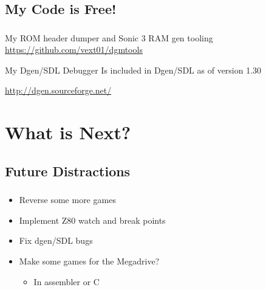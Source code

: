 \documentclass{beamer}
\begin{document}
\subsection{My Code is Free!}
\begin{frame}[fragile]
\frametitle{\insertsubsection}

\begin{block}{My ROM header dumper and Sonic 3 RAM gen tooling}
\url{https://github.com/vext01/dgmtools}
\end{block}

\vfill

\begin{block}{My Dgen/SDL Debugger}
Is included in Dgen/SDL as of version 1.30

\url{http://dgen.sourceforge.net/}
\end{block}

\end{frame}


\section{What is Next?}

\subsection{Future Distractions}

\begin{frame}[fragile]
\frametitle{\insertsubsection}

\begin{itemize}
\item Reverse some more games
\vfill
\item Implement Z80 watch and break points
\vfill
\item Fix dgen/SDL bugs
\vfill
\item Make some games for the Megadrive?
\begin{itemize}
\item In assembler or C
\end{itemize}
\end{itemize}

\end{frame}

\end{document}
